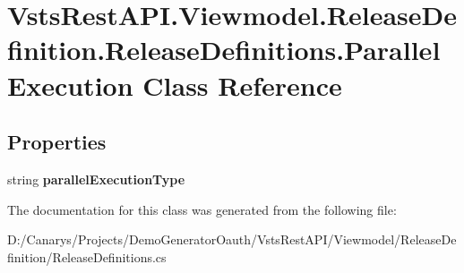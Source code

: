 \hypertarget{class_vsts_rest_a_p_i_1_1_viewmodel_1_1_release_definition_1_1_release_definitions_1_1_parallel_execution}{}\section{Vsts\+Rest\+A\+P\+I.\+Viewmodel.\+Release\+Definition.\+Release\+Definitions.\+Parallel\+Execution Class Reference}
\label{class_vsts_rest_a_p_i_1_1_viewmodel_1_1_release_definition_1_1_release_definitions_1_1_parallel_execution}
\subsection*{Properties}
\begin{DoxyCompactItemize}
\item 
\mbox{\label{class_vsts_rest_a_p_i_1_1_viewmodel_1_1_release_definition_1_1_release_definitions_1_1_parallel_execution_ad2b2b8347bb9f612ac2fd20b45e0bff9}} 
string {\bfseries parallel\+Execution\+Type}
\end{DoxyCompactItemize}


The documentation for this class was generated from the following file\+:\begin{DoxyCompactItemize}
\item 
D\+:/\+Canarys/\+Projects/\+Demo\+Generator\+Oauth/\+Vsts\+Rest\+A\+P\+I/\+Viewmodel/\+Release\+Definition/Release\+Definitions.\+cs\end{DoxyCompactItemize}
